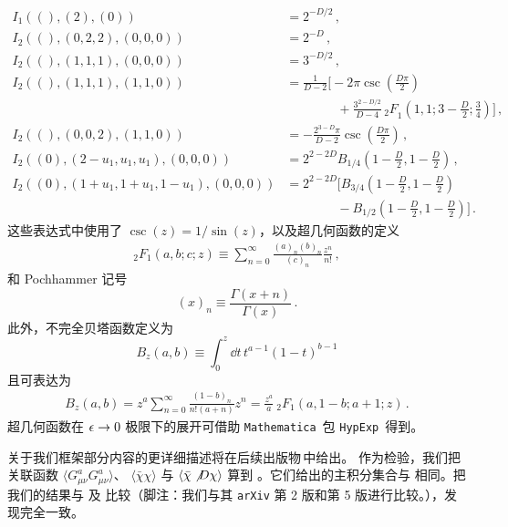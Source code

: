 \begin{equation}
  \begin{split}
    I_1((),(2),(0)) &= 2^{-D/2} \,,\phantom{\Bigg[} \\[10pt]
    I_2((),(0,2,2),(0,0,0)) &= 2^{-D} \,,\phantom{\Bigg[} \\[10pt]
    I_2((),(1,1,1),(0,0,0)) &= 3^{-D/2} \,,\phantom{\Bigg[} \\[10pt]
    I_2((),(1,1,1),(1,1,0)) &= \frac{1}{D-2} \Bigg[ - 2 \pi \csc \left( \frac{D \pi}{2} \right) \\
    & \qquad \qquad+ \frac{3^{2 - D/2}}{D - 4} \, {_2F}_1 \left(1, 1; 3 - \frac{D}{2}; \frac{3}{4} \right) \Bigg] \,,\\[10pt]
    I_2((),(0,0,2),(1,1,0)) &= - \frac{2^{3 - D} \pi}{D - 2} \csc \left( \frac{D \pi}{2} \right) \,, \phantom{\Bigg[} \\[10pt]
    I_2((0),(2-u_1,u_1,u_1),(0,0,0)) &= 2^{2 - 2D} B_{1/4} \left( 1 - \frac{D}{2}, 1 - \frac{D}{2} \right) \,,\phantom{\Bigg[} \\[10pt]
    I_2((0),(1+u_1,1+u_1,1-u_1),(0,0,0)) &= 2^{2 - 2 D} \Bigg[ B_{3/4} \left( 1 - \frac{D}{2}, 1 - \frac{D}{2} \right) \\
    & \qquad \qquad - B_{1/2} \left( 1 - \frac{D}{2}, 1 - \frac{D}{2} \right) \Bigg] \,.
    \label{eq:masters}
  \end{split}
\end{equation}
这些表达式中使用了 $\csc(z)=1/\sin(z)$，以及超几何函数的定义
\begin{equation}
  \begin{split}
    _2F_1(a,b;c;z) \equiv
    \sum_{n=0}^\infty\frac{(a)_n(b)_n}{(c)_n}\frac{z^n}{n!}\,,
  \end{split}
\end{equation}
和 Pochhammer 记号
\begin{equation}
	(x)_n \equiv \frac{\Gamma ( x + n)}{\Gamma(x)} \,.
\end{equation}
此外，不完全贝塔函数定义为
\begin{equation}
  B_z (a, b) \equiv \int_0^z\dd t\, t^{a-1}(1-t)^{b-1}
\end{equation}
且可表达为
\begin{equation}
  \begin{split}
    B_z(a,b) =  z^a \sum_{n = 0}^\infty \frac{(1 - b)_n}{n! (a + n)} z^n
    = \frac{z^a}{a}\ {}_2F_1(a,1-b;a+1;z)\,.
  \end{split}
\end{equation}
超几何函数在 $\ep\to 0$ 极限下的展开可借助
\texttt{Mathematica}\,\cite{Mathematica11.3} 包
\texttt{HypExp}\,\cite{Huber:2005yg,Huber:2007dx} 得到。

关于我们框架部分内容的更详细描述将在后续出版物\,\cite{Artz:2019bpr}中给出。
作为检验，我们把关联函数 $\langle G_{\mu\nu}^aG_{\mu\nu}^a\rangle$、
$\langle \bar\chi\chi\rangle$ 与 $\langle \bar\chi \slashed D \chi\rangle$
算到 \nlo。它们给出的主积分集合与  相同。把我们的结果与
 及  比较（脚注：我们与其
\texttt{arXiv} 第 2 版和第 5 版进行比较。），发现完全一致。
